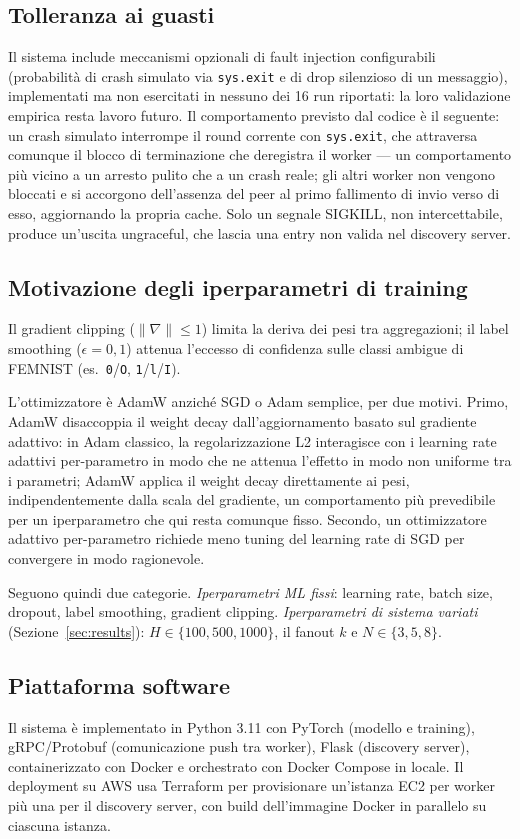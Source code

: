 \subsection{Tolleranza ai guasti}
Il sistema include meccanismi opzionali di fault injection configurabili
(probabilità di crash simulato via \texttt{sys.exit} e di drop silenzioso di
un messaggio), implementati ma non esercitati in nessuno dei 16 run
riportati: la loro
validazione empirica resta lavoro futuro. Il comportamento previsto dal codice è il seguente: un crash
simulato interrompe il round corrente con \texttt{sys.exit}, che attraversa
comunque il blocco di terminazione che deregistra il worker — un
comportamento più vicino a un arresto pulito che a un crash reale; gli altri
worker non vengono bloccati e si accorgono dell'assenza del peer al primo
fallimento di invio verso di esso, aggiornando la propria cache. Solo un
segnale SIGKILL, non intercettabile, produce un'uscita ungraceful,
che lascia una entry non valida nel discovery server.

\subsection{Motivazione degli iperparametri di training}
Il gradient clipping ($\|\nabla\|\le1$) limita la deriva dei pesi tra
aggregazioni; il label smoothing ($\epsilon=0{,}1$)
attenua l'eccesso di confidenza sulle classi ambigue di FEMNIST (es.\
\texttt{0}/\texttt{O}, \texttt{1}/\texttt{l}/\texttt{I}).

L'ottimizzatore è AdamW anziché SGD o Adam
semplice, per due motivi. Primo, AdamW disaccoppia il weight decay
dall'aggiornamento basato sul gradiente adattivo: in Adam classico, la
regolarizzazione L2 interagisce con i learning rate adattivi per-parametro
in modo che ne attenua l'effetto in modo non uniforme tra i parametri;
AdamW applica il weight decay direttamente ai pesi, indipendentemente dalla
scala del gradiente, un comportamento più prevedibile per un iperparametro
 che qui resta comunque fisso. Secondo, un
ottimizzatore adattivo per-parametro richiede meno tuning del learning rate
di SGD per convergere in modo ragionevole.

Seguono quindi due categorie. \emph{Iperparametri ML fissi}:
learning rate, batch size, dropout, label smoothing, gradient clipping. \emph{Iperparametri di
sistema variati} (Sezione~\ref{sec:results}): $H\in\{100,500,1000\}$, il fanout $k$ e $N\in\{3,5,8\}$.

\subsection{Piattaforma software}
Il sistema è implementato in Python 3.11 con PyTorch (modello e training),
gRPC/Protobuf (comunicazione push tra worker), Flask (discovery server), containerizzato
con Docker e orchestrato con Docker Compose in locale. Il deployment su AWS
usa Terraform per provisionare un'istanza EC2 per worker più una per il
discovery server, con build dell'immagine Docker in parallelo su ciascuna istanza.

